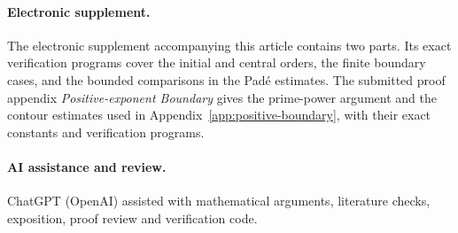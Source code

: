 \documentclass[11pt]{article}
\theoremstyle{remark}
\begin{document}
\paragraph{Electronic supplement.}
The electronic supplement accompanying this article contains two parts.
Its exact verification programs cover the initial and central orders,
the finite boundary cases, and the bounded comparisons in the
Pad\'e estimates. The submitted proof appendix
\textit{Positive-exponent Boundary} gives the prime-power argument
and the contour estimates used in Appendix~\ref{app:positive-boundary},
with their exact constants and verification programs.

\paragraph{AI assistance and review.}
ChatGPT (OpenAI) assisted with mathematical arguments, literature checks,
exposition, proof review and verification code.

\appendix







\end{document}
